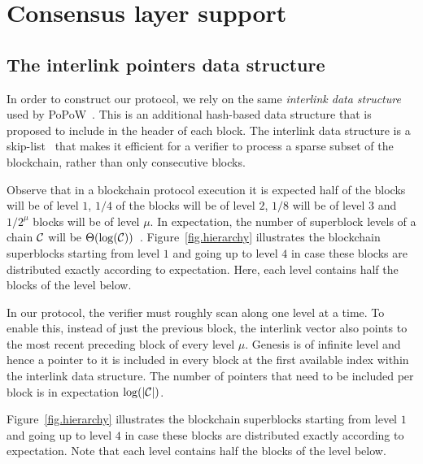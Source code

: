 \section{Consensus layer support} \label{sec.consensus}

\subsection{The interlink pointers data structure}
\label{sec.interlink}

In order to construct our protocol, we rely on the same \emph{interlink data
structure} used by PoPoW~\cite{KLS}. This is an additional hash-based data
structure that is proposed to include in the header of each block. The
interlink data structure is a skip-list~\cite{skiplist} that makes it efficient
for a verifier to process a sparse subset of the blockchain, rather than only
consecutive blocks.

Observe that in a blockchain protocol execution it is expected half of the
blocks will be of level $1$, $1/4$ of the blocks will be of level $2$, $1/8$
will be of level $3$ and $1/2^\mu$ blocks will be of level $\mu$. In
expectation, the number of superblock levels of a chain $\mathcal{C}$ will be
$\Theta(\log(\mathcal{C}))$~\cite{KLS}. Figure~\ref{fig.hierarchy} illustrates the
blockchain superblocks starting from level $1$ and going up to level $4$ in case
these blocks are distributed exactly according to expectation. Here, each level
contains half the blocks of the level below.

In our protocol, the verifier must roughly scan along one level at a time. To
enable this, instead of just the previous block, the interlink vector also
points to the most recent preceding block of every level $\mu$. Genesis is of
infinite level and hence a pointer to it is included in every block at the first
available index within the interlink data structure. The number of pointers that
need to be included per block is in expectation $\log(|\mathcal{C}|)$.

Figure~\ref{fig.hierarchy} illustrates the blockchain superblocks starting from
level $1$ and going up to level $4$ in case these blocks are distributed
exactly according to expectation. Note that each level contains half the blocks
of the level below.

